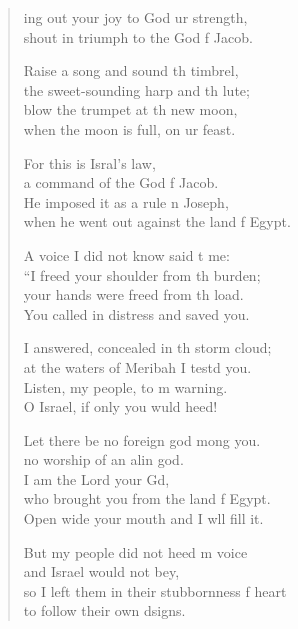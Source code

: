 \settowidth{\versewidth}{so I left them in their stubbornness of heart *}
\begin{verse}%
  \begin{patverse}
ing out your joy to God ur strength,\Med\\
shout in triumph to the God f Jacob.

Raise a song and sound th timbrel,\Med\\
the sweet-sounding harp and th lute;\\
blow the trumpet at th new moon,\Med\\
when the moon is full, on ur feast.

For this is Isral’s law,\Med\\
a command of the God f Jacob.\\
He imposed it as a rule n Joseph,\Med\\
when he went out against the land f Egypt.

A voice I did not know said t me:\Med\\
“I freed your shoulder from th burden;\\
your hands were freed from th load.\Med\\
You called in distress and  saved you.

I answered, concealed in th storm cloud;\Med\\
at the waters of Meribah I testd you.\\
Listen, my people, to m warning.\Med\\
O Israel, if only you wuld heed!

Let there be no foreign god mong you.\Med\\
no worship of an alin god.\\
I am the Lord your Gd,\Flex\\
who brought you from the land f Egypt.\Med\\
Open wide your mouth and I w\pointup{\i}ll fill it.

But my people did not heed m voice\Med\\
and Israel would not bey,\\
so I left them in their stubbornness f heart\Med\\
to follow their own dsigns.


\end{patverse}
\end{verse}
